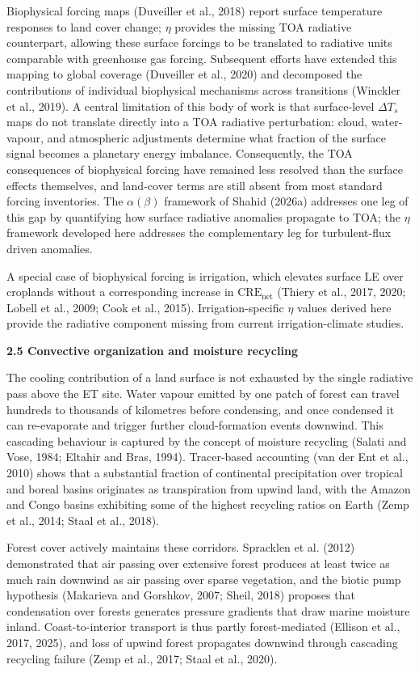Biophysical forcing maps (Duveiller et al., 2018) report surface temperature responses to land cover change; $\eta$ provides the missing TOA radiative counterpart, allowing these surface forcings to be translated to radiative units comparable with greenhouse gas forcing. Subsequent efforts have extended this mapping to global coverage (Duveiller et al., 2020) and decomposed the contributions of individual biophysical mechanisms across transitions (Winckler et al., 2019). A central limitation of this body of work is that surface-level $\Delta T_s$ maps do not translate directly into a TOA radiative perturbation: cloud, water-vapour, and atmospheric adjustments determine what fraction of the surface signal becomes a planetary energy imbalance. Consequently, the TOA consequences of biophysical forcing have remained less resolved than the surface effects themselves, and land-cover terms are still absent from most standard forcing inventories. The $\alpha(\beta)$ framework of Shahid (2026a) addresses one leg of this gap by quantifying how surface radiative anomalies propagate to TOA; the $\eta$ framework developed here addresses the complementary leg for turbulent-flux driven anomalies.

A special case of biophysical forcing is irrigation, which elevates surface LE over croplands without a corresponding increase in $\mathrm{CRE}_{\mathrm{net}}$ (Thiery et al., 2017, 2020; Lobell et al., 2009; Cook et al., 2015). Irrigation-specific $\eta$ values derived here provide the radiative component missing from current irrigation-climate studies.

\textbf{2.5 Convective organization and moisture recycling}

The cooling contribution of a land surface is not exhausted by the single radiative pass above the ET site. Water vapour emitted by one patch of forest can travel hundreds to thousands of kilometres before condensing, and once condensed it can re-evaporate and trigger further cloud-formation events downwind. This cascading behaviour is captured by the concept of moisture recycling (Salati and Vose, 1984; Eltahir and Bras, 1994). Tracer-based accounting (van der Ent et al., 2010) shows that a substantial fraction of continental precipitation over tropical and boreal basins originates as transpiration from upwind land, with the Amazon and Congo basins exhibiting some of the highest recycling ratios on Earth (Zemp et al., 2014; Staal et al., 2018).

Forest cover actively maintains these corridors. Spracklen et al. (2012) demonstrated that air passing over extensive forest produces at least twice as much rain downwind as air passing over sparse vegetation, and the biotic pump hypothesis (Makarieva and Gorshkov, 2007; Sheil, 2018) proposes that condensation over forests generates pressure gradients that draw marine moisture inland. Coast-to-interior transport is thus partly forest-mediated (Ellison et al., 2017, 2025), and loss of upwind forest propagates downwind through cascading recycling failure (Zemp et al., 2017; Staal et al., 2020).

